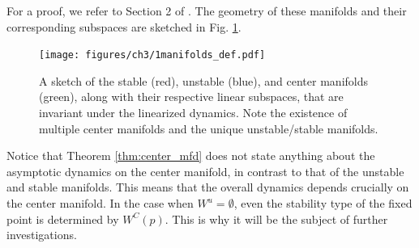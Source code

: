 For a proof, we refer to Section 2 of \cite{marsden_hopf_1976}. The geometry of these manifolds and their corresponding subspaces are sketched in Fig. \ref{fig:mfds_def}.
\begin{figure}[h!]
	\centering
	\texttt{[image: figures/ch3/1manifolds\_def.pdf]}
	\caption{A sketch of the stable (red), unstable (blue), and center manifolds (green), along with their respective linear subspaces, that are invariant under the linearized dynamics. Note the existence of multiple center manifolds and the unique unstable/stable manifolds.}
	\label{fig:mfds_def}
\end{figure}


Notice that Theorem \ref{thm:center_mfd} does not state anything  about the asymptotic dynamics on the center manifold, in contrast to that of the unstable and stable manifolds. This means that the overall dynamics depends crucially on the center manifold. In the case when $W^u=\emptyset$, even the stability type of the fixed point is determined by $W^C(p)$. This is why it will be the subject of further investigations.

